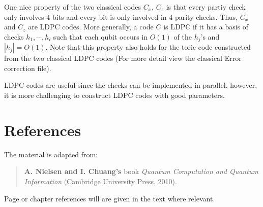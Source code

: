 \documentclass[11pt,a4paper]{article}
\theoremstyle{definition}
\theoremstyle{plain}
\theoremstyle{remark}
\begin{document}
One nice property of the two classical codes $C_x$, $C_z$ is that every partiy check only involves $4$ bits and every bit is only involved in 
$4$ parity checks. Thus, $C_x$ and $C_z$ are LDPC codes. More generally, a code $C$ is LDPC if it has a basis of checks 
$h_1, \cdots, h_l$ such that each qubit occurs in $O(1)$ of the $h_j$'s and $|h_j| = O(1)$. Note that this property also holds 
for the toric code constructed from the two classical LDPC codes (For more detail view the classical Error correction file). 

LDPC codes are useful since the checks can be implemented in parallel, however, it is more challenging to construct LDPC codes with good parameters. 

\section{References}
The material is adapted from: 
\begin{quote}
\textbf{A. Nielsen and I. Chuang's} book \emph{Quantum Computation and Quantum Information} (Cambridge University Press, 2010).
\end{quote}
Page or chapter references will are given in the text where relevant. 
\end{document}
